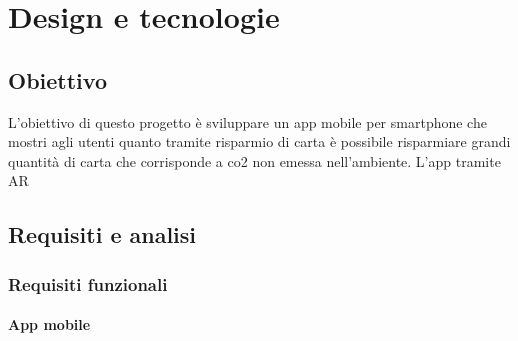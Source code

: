 \chapter{Design e tecnologie}
\section{Obiettivo}
L'obiettivo di questo progetto è sviluppare un app mobile per smartphone che mostri agli utenti quanto tramite risparmio di carta è possibile risparmiare grandi quantità di carta che corrisponde a co2 non emessa nell'ambiente. L'app tramite AR 
\section{Requisiti e analisi}
\subsection{Requisiti funzionali}
\subsubsection{App mobile}
